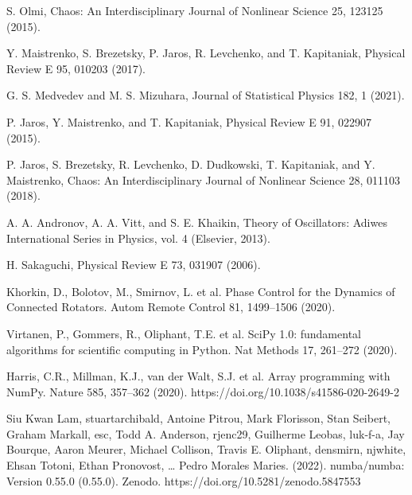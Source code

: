 \documentclass[a4paper,12pt, titlepage]{report} %
\theoremstyle{plain}
\begin{document}
\begin{thebibliography}{10}
    S. Olmi, Chaos: An Interdisciplinary Journal of Nonlinear Science 25, 123125 (2015).

    Y. Maistrenko, S. Brezetsky, P. Jaros, R. Levchenko, and T. Kapitaniak, Physical Review E 95, 010203 (2017).

    G. S. Medvedev and M. S. Mizuhara, Journal of Statistical Physics 182, 1 (2021).

    P. Jaros, Y. Maistrenko, and T. Kapitaniak, Physical Review E 91, 022907 (2015).

    P. Jaros, S. Brezetsky, R. Levchenko, D. Dudkowski, T. Kapitaniak, and Y. Maistrenko, Chaos: An Interdisciplinary Journal of Nonlinear Science 28, 011103 (2018).

    A. A. Andronov, A. A. Vitt, and S. E. Khaikin, Theory of Oscillators: Adiwes International Series in Physics, vol. 4 (Elsevier, 2013).

    H. Sakaguchi, Physical Review E 73, 031907 (2006).

    Khorkin, D., Bolotov, M., Smirnov, L. et al. Phase Control for the Dynamics of Connected Rotators. Autom Remote Control 81, 1499–1506 (2020).

    Virtanen, P., Gommers, R., Oliphant, T.E. et al. SciPy 1.0: fundamental algorithms for scientific computing in Python. Nat Methods 17, 261–272 (2020).

    Harris, C.R., Millman, K.J., van der Walt, S.J. et al. Array programming with NumPy. Nature 585, 357–362 (2020). https://doi.org/10.1038/s41586-020-2649-2

    Siu Kwan Lam, stuartarchibald, Antoine Pitrou, Mark Florisson, Stan Seibert, Graham Markall, esc, Todd A. Anderson, rjenc29, Guilherme Leobas, luk-f-a, Jay Bourque, Aaron Meurer, Michael Collison, Travis E. Oliphant, densmirn, njwhite, Ehsan Totoni, Ethan Pronovost, … Pedro Morales Maries. (2022). numba/numba: Version 0.55.0 (0.55.0). Zenodo. https://doi.org/10.5281/zenodo.5847553

  \end{thebibliography}
\end{document}
